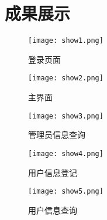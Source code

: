 \chapter{成果展示}
\begin{figure}[htbp]
    \centering
    \texttt{[image: show1.png]}
    \caption{登录页面}\label{fig:show1}
    \vspace{\baselineskip}
    \end{figure}
    \begin{figure}[htbp]
        \centering
        \texttt{[image: show2.png]}
        \caption{主界面}\label{fig:show2}
        \vspace{\baselineskip}
        \end{figure}
    \begin{figure}[htbp]
            \centering
            \texttt{[image: show3.png]}
            \caption{管理员信息查询}\label{fig:show3}
            \vspace{\baselineskip}
            \end{figure}
    \begin{figure}[htbp]
                \centering
                \texttt{[image: show4.png]}
                \caption{用户信息登记}\label{fig:show4}
                \vspace{\baselineskip}
                \end{figure}
                \begin{figure}[htbp]
                    \centering
                    \texttt{[image: show5.png]}
                    \caption{用户信息查询}\label{fig:show5}
                    \vspace{\baselineskip}
                    \end{figure}